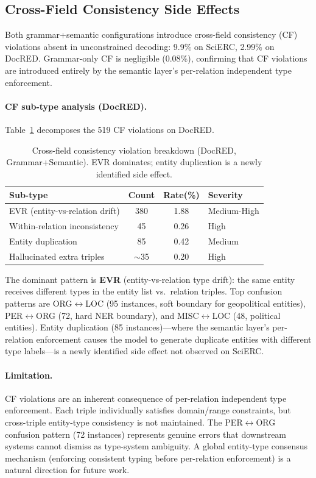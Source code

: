 \documentclass[11pt,a4paper]{article}
\begin{document}
\subsection{Cross-Field Consistency Side Effects}
\label{sec:cf}

Both grammar+semantic configurations introduce cross-field consistency (CF) violations absent in unconstrained decoding: 9.9\% on SciERC, 2.99\% on DocRED.
Grammar-only CF is negligible (0.08\%), confirming that CF violations are introduced entirely by the semantic layer's per-relation independent type enforcement.

\paragraph{CF sub-type analysis (DocRED).}
Table~\ref{tab:cf_breakdown} decomposes the 519 CF violations on DocRED.

\begin{table}[t]
\centering
\caption{Cross-field consistency violation breakdown (DocRED, Grammar+Semantic). EVR dominates; entity duplication is a newly identified side effect.}
\label{tab:cf_breakdown}
\small
\begin{tabular}{lccl}
\toprule
\textbf{Sub-type} & \textbf{Count} & \textbf{Rate(\%)} & \textbf{Severity} \\
\midrule
EVR (entity-vs-relation drift) & 380 & 1.88 & Medium-High \\
Within-relation inconsistency  &  45 & 0.26 & High \\
Entity duplication              &  85 & 0.42 & Medium \\
Hallucinated extra triples     & ${\sim}$35 & 0.20 & High \\
\bottomrule
\end{tabular}
\end{table}

The dominant pattern is \textbf{EVR} (entity-vs-relation type drift): the same entity receives different types in the entity list vs.\ relation triples.
Top confusion patterns are ORG$\leftrightarrow$LOC (95 instances, soft boundary for geopolitical entities), PER$\leftrightarrow$ORG (72, hard NER boundary), and MISC$\leftrightarrow$LOC (48, political entities).
Entity duplication (85 instances)---where the semantic layer's per-relation enforcement causes the model to generate duplicate entities with different type labels---is a newly identified side effect not observed on SciERC.

\paragraph{Limitation.}
CF violations are an inherent consequence of per-relation independent type enforcement.
Each triple individually satisfies domain/range constraints, but cross-triple entity-type consistency is not maintained.
The PER$\leftrightarrow$ORG confusion pattern (72 instances) represents genuine errors that downstream systems cannot dismiss as type-system ambiguity.
A global entity-type consensus mechanism (enforcing consistent typing before per-relation enforcement) is a natural direction for future work.
\end{document}
